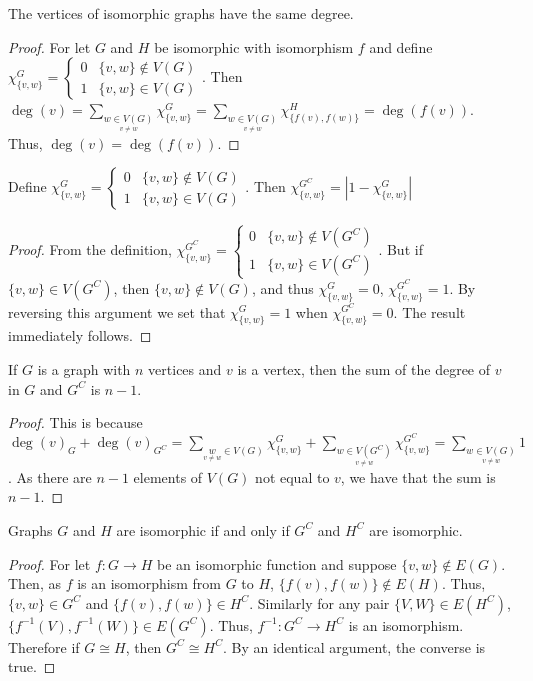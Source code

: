 \documentclass[crop=false,class=book]{standalone}
\begin{document}
\begin{theorem}
The vertices of isomorphic graphs have the same degree.
\end{theorem}
\begin{proof}
For let $G$ and $H$ be isomorphic with isomorphism $f$ and define $\chi_{\{v,w\}}^G = \begin{cases} 0 & \{v,w\} \notin V(G) \\ 1 & \{v,w\} \in V(G) \end{cases}$. Then $\deg(v) = \sum_{\underset{v\ne w}{w\in V(G)}}\chi_{\{v,w\}}^G =\sum_{\underset{v\ne w}{w\in V(G)}}\chi_{\{f(v),f(w)\}}^H = \deg(f(v))$. Thus, $\deg(v) = \deg(f(v))$.
\end{proof}
\begin{lemma}
Define  $\chi_{\{v,w\}}^G = \begin{cases} 0 & \{v,w\} \notin V(G) \\ 1 & \{v,w\} \in V(G) \end{cases}$. Then $\chi_{\{v,w\}}^{G^C} = |1-\chi_{\{v,w\}}^G|$
\end{lemma}
\begin{proof}
From the definition, $\chi_{\{v,w\}}^{G^C} = \begin{cases} 0 & \{v,w\} \notin V(G^C) \\ 1 & \{v,w\} \in V(G^C) \end{cases}$. But if $\{v,w\} \in V({G^C})$, then $\{v,w\}\notin V(G)$, and thus $\chi_{\{v,w\}}^G = 0$, $\chi_{\{v,w\}}^{G^C} = 1$. By reversing this argument we set that $\chi_{\{v,w\}}^{G} = 1$ when $\chi_{\{v,w\}}^{G^C} = 0$. The result immediately follows.
\end{proof}
\begin{corollary}
If $G$ is a graph with $n$ vertices and $v$ is a vertex, then the sum of the degree of $v$ in $G$ and $G^C$ is $n-1$.
\end{corollary}
\begin{proof}
This is because $\deg(v)_G+\deg(v)_{G^C} = \sum_{\underset{v\ne w}w\in V(G)}\chi_{\{v,w\}}^G + \sum_{\underset{v\ne w}{w\in V(G^C)}}\chi_{\{v,w\}}^{G^C} = \sum_{\underset{v\ne w}{w\in V(G)}} 1$. As there are $n-1$ elements of $V(G)$ not equal to $v$, we have that the sum is $n-1$.
\end{proof}
\begin{theorem}
Graphs $G$ and $H$ are isomorphic if and only if $G^C$ and $H^C$ are isomorphic.
\end{theorem}
\begin{proof}
For let $f:G\rightarrow H$ be an isomorphic function and suppose $\{v,w\}\notin E(G)$. Then, as $f$ is an isomorphism from $G$ to $H$, $\{f(v),f(w)\}\notin E(H)$. Thus, $\{v,w\}\in G^C$ and $\{f(v),f(w)\}\in H^C$. Similarly for any pair $\{V,W\}\in E(H^C)$, $\{f^{-1}(V),f^{-1}(W)\} \in E(G^C)$. Thus, $f^{-1}:G^C \rightarrow H^C$ is an isomorphism. Therefore if $G\cong H$, then $G^C \cong H^C$. By an identical argument, the converse is true.
\end{proof}
\end{document}
